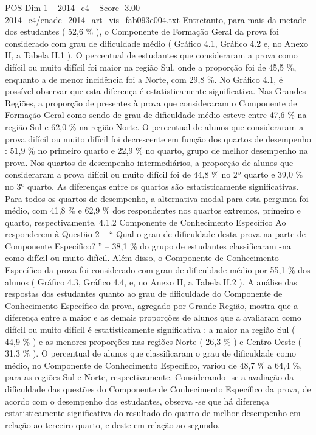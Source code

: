 \begin{textsample}{POS Dim 1 – 2014\_c4 – Score -3.00 – 2014\_c4/enade\_2014\_art\_vis\_fab093e004.txt}
Entretanto, para mais da metade dos estudantes ( 52,6 \% ), o Componente de Formação Geral da prova foi considerado com grau de dificuldade médio ( Gráfico 4.1, Gráfico 4.2 e, no Anexo II, a Tabela II.1 ).
O percentual de estudantes que consideraram a prova como difícil ou muito difícil foi maior na região Sul, onde a proporção foi de 45,5 \%, enquanto a de menor incidência foi a Norte, com 29,8 \%.
No Gráfico 4.1, é possível observar que esta diferença é estatisticamente significativa.
Nas Grandes Regiões, a proporção de presentes à prova que consideraram o Componente de Formação Geral como sendo de grau de dificuldade médio esteve entre 47,6 \% na região Sul e 62,0 \% na região Norte.
O percentual de alunos que consideraram a prova difícil ou muito difícil foi decrescente em função dos quartos de desempenho : 51,9 \% no primeiro quarto e 22,9 \% no quarto, grupo de melhor desempenho na prova.
Nos quartos de desempenho intermediários, a proporção de alunos que consideraram a prova difícil ou muito difícil foi de 44,8 \% no 2º quarto e 39,0 \% no 3º quarto.
As diferenças entre os quartos são estatisticamente significativas.
Para todos os quartos de desempenho, a alternativa modal para esta pergunta foi médio, com 41,8 \% e 62,9 \% dos respondentes nos quartos extremos, primeiro e quarto, respectivamente. 4.1.2 Componente de Conhecimento Específico Ao responderem à Questão 2 – “ Qual o grau de dificuldade desta prova na parte de Componente Específico? ” – 38,1 \% do grupo de estudantes classificaram -na como difícil ou muito difícil.
Além disso, o Componente de Conhecimento Específico da prova foi considerado com grau de dificuldade médio por 55,1 \% dos alunos ( Gráfico 4.3, Gráfico 4.4, e, no Anexo II, a Tabela II.2 ).
A análise das respostas dos estudantes quanto ao grau de dificuldade do Componente de Conhecimento Específico da prova, agregado por Grande Região, mostra que a diferença entre a maior e as demais proporções de alunos que a avaliaram como difícil ou muito difícil é estatisticamente significativa : a maior na região Sul ( 44,9 \% ) e as menores proporções nas regiões Norte ( 26,3 \% ) e Centro-Oeste ( 31,3 \% ).
O percentual de alunos que classificaram o grau de dificuldade como médio, no Componente de Conhecimento Específico, variou de 48,7 \% a 64,4 \%, para as regiões Sul e Norte, respectivamente.
Considerando -se a avaliação da dificuldade das questões do Componente de Conhecimento Específico da prova, de acordo com o desempenho dos estudantes, observa -se que há diferença estatisticamente significativa do resultado do quarto de melhor desempenho em relação ao terceiro quarto, e deste em relação ao segundo.

\end{textsample}
